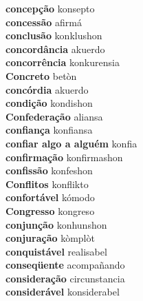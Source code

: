 \textbf{ concepção  } konsepto \\
\textbf{ concessão  } afirmá \\
\textbf{ conclusão  } konklushon \\
\textbf{ concordância  } akuerdo \\
\textbf{ concorrência  } konkurensia \\
\textbf{ Concreto  } betòn \\
\textbf{ concórdia  } akuerdo \\
\textbf{ condição  } kondishon \\
\textbf{ Confederação  } aliansa \\
\textbf{ confiança  } konfiansa \\
\textbf{ confiar algo a alguém  } konfia \\
\textbf{ confirmação  } konfirmashon \\
\textbf{ confissão  } konfeshon \\
\textbf{ Conflitos  } konflikto \\
\textbf{ confortável  } kómodo \\
\textbf{ Congresso  } kongreso \\
\textbf{ conjunção  } konhunshon \\
\textbf{ conjuração  } kòmplòt \\
\textbf{ conquistável  } realisabel \\
\textbf{ conseqüente  } acompañando \\
\textbf{ consideração  } circunstancia \\
\textbf{ considerável  } konsiderabel \\
